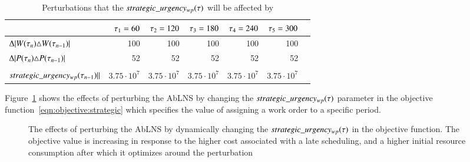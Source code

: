 \begin{table}[H]
	\centering
	\begin{tabular}{lrrrrrr}
	\toprule
	                                                                                                                   & $\VarMetaTime_1 = 60$ & $\VarMetaTime_2 = 120$ & $\VarMetaTime_3 = 180$ & $\VarMetaTime_4 = 240$ & $\VarMetaTime_5 = 300$ \\ \midrule
	$\Delta |\SetWorkOrder[\VarMetaTime_{n}]{} \triangle \SetWorkOrder[\VarMetaTime_{n-1}]{}              |$           & 100                                                           & 100                                                            & 100                                                            & 100                                                            & 100                                                      \\ \midrule
	$\Delta |\SetPeriod[\VarMetaTime_{n}]{} \triangle \SetPeriod[\VarMetaTime_{n-1}]{}                    |$           & 52                                                            & 52                                                             & 52                                                             & 52                                                             & 52                                                       \\ \midrule
	\makecell{$ ||\ParStrategicUrgency[\VarMetaTime_{n}] -$\\ $\ParStrategicUrgency[\VarMetaTime_{n - 1}]||$}        & $3.75 \cdot 10^{7}$                                           & $3.75 \cdot 10^{7}$                                            & $3.75 \cdot 10^{7}$                                            & $3.75 \cdot 10^{7}$                                            & $3.75 \cdot 10^{7}$                                       \\ \bottomrule
	\end{tabular}
	\caption{Perturbations that the $\ParStrategicUrgency$ will be affected by
	}\label{tab:responses:urgency-change}
\end{table}

Figure~\ref{fig:responses:value_change} shows the effects of
perturbing the AbLNS by changing the $\ParStrategicUrgency$ parameter in the objective
function~\ref{eqn:objective:strategic} which specifies the value of assigning a
work order to a specific period.

\begin{figure}[H]%
	\centering
	\resizebox{\linewidth}{!}{
		
	}
	\caption{The effects of perturbing the AbLNS by dynamically changing the
		$\ParStrategicUrgency$ in the objective function. The objective value
		is increasing in response to the higher cost associated with a late
		scheduling, and a higher initial resource consumption
		after which it optimizes around the perturbation
	}\label{fig:responses:value_change}
\end{figure}
 
